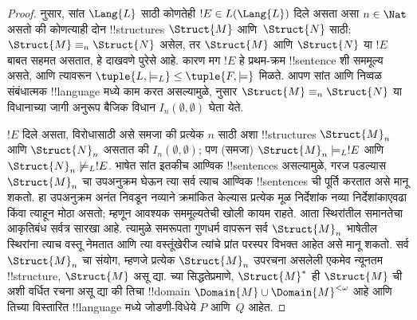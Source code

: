 \documentclass[../../../include/open-logic-section]{subfiles}
\begin{document}
\begin{proof}
 नुसार, सांत $\Lang{L}$ साठी कोणतेही $!E
\in L(\Lang{L})$ दिले असता असा $n \in \Nat$ असतो की कोणत्याही दोन
!!{structure}s $\Struct{M}$ आणि~$\Struct{N}$ साठी: $\Struct{M}
\equiv_n \Struct{N}$ असेल, तर $\Struct{M}$ आणि $\Struct{N}$ या $!E$
बाबत सहमत असतात, हे दाखवणे पुरेसे आहे. कारण मग $!E$ हे प्रथम-क्रम
!!{sentence} शी सममूल्य असते, आणि त्यावरून $\tuple{L, \models_L} \le
\tuple{F, \models}$ मिळते. आपण सांत आणि निव्वळ संबंधात्मक
!!{language} मध्ये काम करत असल्यामुळे, 
नुसार $\Struct{M} \equiv_n \Struct{N}$ या विधानाच्या जागी अनुरूप बैजिक
विधान $I_n(\emptyset,\emptyset)$ घेता येते.

$!E$ दिले असता, विरोधासाठी असे समजा की प्रत्येक $n$ साठी अशा
!!{structure}s $\Struct{M}_n$ आणि $\Struct{N}_n$ असतात की
$I_n(\emptyset, \emptyset)$; पण (समजा) $\Struct{M}_n \models_L !E$
आणि $\Struct{N}_n \not\models_L !E$. भाषेत सांत इतकीच आण्विक
!!{sentence}s असल्यामुळे, गरज पडल्यास $\Struct{M}_n$ चा उपअनुक्रम
घेऊन त्या सर्व त्याच आण्विक !!{sentence}s ची पूर्ति करतात असे मानू
शकतो. हा उपअनुक्रम अनंत निवडून नव्याने क्रमांकित केल्यास प्रत्येक मूळ
निर्देशांक नव्या निर्देशांकाएवढा किंवा त्याहून मोठा असतो; म्हणून आवश्यक
सममूल्यतेची खोली कायम राहते. आता स्थिरांतील समानतेचा आकृतिबंध सर्वत्र
सारखा आहे. त्यामुळे समरूपता गुणधर्म वापरून सर्व $\Struct{M}_n$ भाषेतील
स्थिरांना त्याच वस्तू नेमतात आणि त्या वस्तूंखेरीज त्यांचे प्रांत परस्पर
विभक्त आहेत असे मानू शकतो. सर्व $\Struct{M}_n$ चा संयोग,
म्हणजे प्रत्येक $\Struct{M}_n$ उपरचना असलेली एकमेव न्यूनतम
!!{structure}, $\Struct{M}$ असू द्या. 
च्या सिद्धतेप्रमाणे, $\Struct{M}^*$ ही $\Struct{M}$ ची अशी वर्धित रचना
असू द्या की तिचा !!{domain} $\Domain{M} \cup
\Domain{M}^{<\omega}$ आहे आणि तिच्या विस्तारित !!{language} मध्ये
जोडणी-विधेये $P$ आणि~$Q$ आहेत.


\end{proof}
\end{document}
